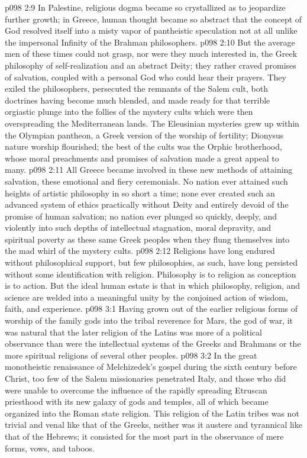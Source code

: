 \vs p098 2:9 In Palestine, religious dogma became so crystallized as to jeopardize further growth; in Greece, human thought became so abstract that the concept of God resolved itself into a misty vapor of pantheistic speculation not at all unlike the impersonal Infinity of the Brahman philosophers.
\vs p098 2:10 \pc But the average men of these times could not grasp, nor were they much interested in, the Greek philosophy of self\hyp{}realization and an abstract Deity; they rather craved promises of salvation, coupled with a personal God who could hear their prayers. They exiled the philosophers, persecuted the remnants of the Salem cult, both doctrines having become much blended, and made ready for that terrible orgiastic plunge into the follies of the mystery cults which were then overspreading the Mediterranean lands. The Eleusinian mysteries grew up within the Olympian pantheon, a Greek version of the worship of fertility; Dionysus nature worship flourished; the best of the cults was the Orphic brotherhood, whose moral preachments and promises of salvation made a great appeal to many.
\vs p098 2:11 All Greece became involved in these new methods of attaining salvation, these emotional and fiery ceremonials. No nation ever attained such heights of artistic philosophy in so short a time; none ever created such an advanced system of ethics practically without Deity and entirely devoid of the promise of human salvation; no nation ever plunged so quickly, deeply, and violently into such depths of intellectual stagnation, moral depravity, and spiritual poverty as these same Greek peoples when they flung themselves into the mad whirl of the mystery cults.
\vs p098 2:12 \pc Religions have long endured without philosophical support, but few philosophies, as such, have long persisted without some identification with religion. Philosophy is to religion as conception is to action. But the ideal human estate is that in which philosophy, religion, and science are welded into a meaningful unity by the conjoined action of wisdom, faith, and experience.
\vs p098 3:1 Having grown out of the earlier religious forms of worship of the family gods into the tribal reverence for Mars, the god of war, it was natural that the later religion of the Latins was more of a political observance than were the intellectual systems of the Greeks and Brahmans or the more spiritual religions of several other peoples.
\vs p098 3:2 In the great monotheistic renaissance of Melchizedek’s gospel during the sixth century before Christ, too few of the Salem missionaries penetrated Italy, and those who did were unable to overcome the influence of the rapidly spreading Etruscan priesthood with its new galaxy of gods and temples, all of which became organized into the Roman state religion. This religion of the Latin tribes was not trivial and venal like that of the Greeks, neither was it austere and tyrannical like that of the Hebrews; it consisted for the most part in the observance of mere forms, vows, and taboos.
